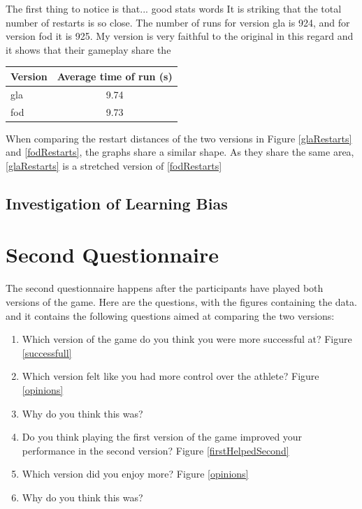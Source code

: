 \documentclass[12pt,a4paper,twoside,openright]{report}
\begin{document}
The first thing to notice is that... good stats words
It is striking that the total number of restarts is so close. The number of runs for version gla is 924, and for version fod it is 925.
My version is very faithful to the original in this regard and it shows that their gameplay share the 


\begin{center}
\begin{tabular}{ |p{3cm}|c| }
  \hline
Version& Average time of run (s)\\ \hline
gla & 9.74 \\ \hline
fod & 9.73 \\ \hline
\end{tabular}
\end{center}


When comparing the restart distances of the two versions in Figure \ref{glaRestarts} and \ref{fodRestarts}, the graphs share a similar shape. As they share the same area, \ref{glaRestarts} is a stretched version of \ref{fodRestarts}

\subsection{Investigation of Learning Bias}
\label{learningBias}




\section{Second Questionnaire}
\label{q2}

The second questionnaire happens after the participants have played both versions of the game.
Here are the questions, with the figures containing the data.
and it contains the following questions aimed at comparing the two versions:

\begin{enumerate}
	\item Which version of the game do you think you were more successful at? Figure \ref{successfull}
	\item Which version felt like you had more control over the athlete? Figure \ref{opinions}
	\item Why do you think this was?
	\item Do you think playing the first version of the game improved your performance in the second version? Figure \ref{firstHelpedSecond}
	\item Which version did you enjoy more? Figure \ref{opinions}
	\item Why do you think this was?
\end{enumerate}
\end{document}
